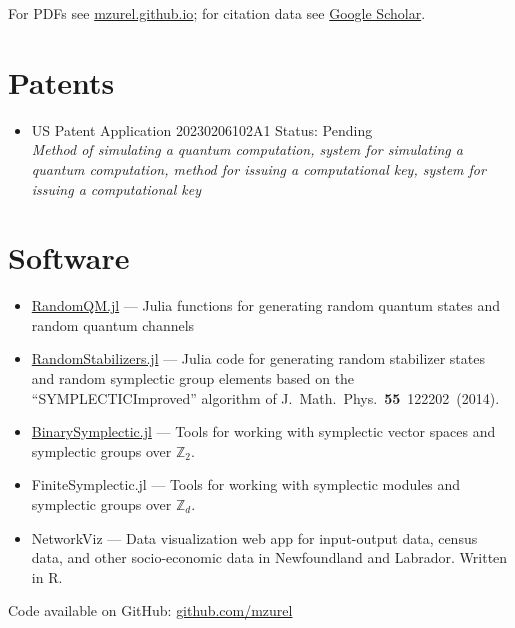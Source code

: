 \documentclass[letterpaper,11pt]{article}
\newcommand{\ConferenceItem}[3]{
	\item{\parbox{0.97\textwidth}{
		{#1}  \hfill {#2}\\
		\emph{#3}
	}}
}
\begin{document}
\nocite{ZurelCohenRaussendorf2023,ZurelRaussendorf2023,RaussendorfFeldmann2022,ZurelHeimendahl2022,OkayRaussendorf2021,Zurel2020,ZurelRaussendorf2020,RaussendorfZurel2020}
\printbibliography[title={Publications \& preprints}]
For PDFs see \href{mzurel.github.io}{mzurel.github.io}; for citation data see \href{https://scholar.google.com/citations?user=qUA_szUAAAAJ&hl=en&oi=ao}{Google Scholar}.


\section*{Patents}
\begin{itemize}[leftmargin=*]
	\ConferenceItem{US Patent Application 20230206102A1}{Status: Pending}{Method of simulating a quantum computation, system for simulating a quantum computation, method for issuing a computational key, system for issuing a computational key}
\end{itemize}


\section*{Software}
\begin{itemize}[leftmargin=*]
	\item \href{https://github.com/mzurel/RandomQM.jl}{RandomQM.jl} --- Julia functions for generating random quantum states and random quantum channels
	\vspace{-4pt}
	\item \href{https://github.com/mzurel/RandomStabilizers.jl}{RandomStabilizers.jl} --- Julia code for generating random stabilizer states and random symplectic group elements based on the ``SYMPLECTICImproved'' algorithm of J.~Math.~Phys.~\textbf{55}~122202~(2014).
	\vspace{-4pt}
	\item \href{https://github.com/mzurel/BinarySymplectic.jl}{BinarySymplectic.jl} --- Tools for working with symplectic vector spaces and symplectic groups over $\mathbb{Z}_2$.
	\vspace{-4pt}
	\item FiniteSymplectic.jl --- Tools for working with symplectic modules and symplectic groups over $\mathbb{Z}_d$.
	\item NetworkViz --- Data visualization web app for input-output data, census data, and other socio-economic data in Newfoundland and Labrador.  Written in R.
\end{itemize}
Code available on GitHub: \href{https://github.com/mzurel}{github.com/mzurel}
\end{document}
